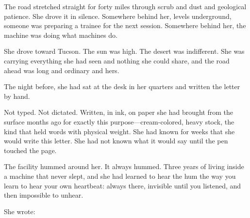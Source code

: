 The road stretched straight for forty miles through scrub and dust and geological patience. She drove it in silence. Somewhere behind her, levels underground, someone was preparing a trainee for the next session. Somewhere behind her, the machine was doing what machines do.

She drove toward Tucson. The sun was high. The desert was indifferent. She was carrying everything she had seen and nothing she could share, and the road ahead was long and ordinary and hers.

\scenebreak

The night before, she had sat at the desk in her quarters and written the letter by hand.

Not typed. Not dictated. Written, in ink, on paper she had brought from the surface months ago for exactly this purpose---cream-colored, heavy stock, the kind that held words with physical weight. She had known for weeks that she would write this letter. She had not known what it would say until the pen touched the page.

The facility hummed around her. It always hummed. Three years of living inside a machine that never slept, and she had learned to hear the hum the way you learn to hear your own heartbeat: always there, invisible until you listened, and then impossible to unhear.

She wrote:

